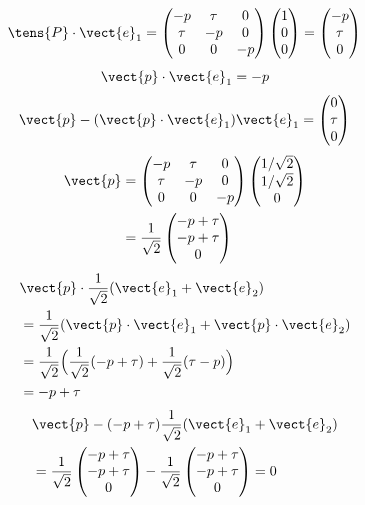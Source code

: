 \[ \tens{P}\cdot\vect{e}_{1}=\begin{pmatrix}-p&\tau&0\\\tau&-p&0\\0&0&-p\end{pmatrix}\begin{pmatrix}1\\0\\0\end{pmatrix}=\begin{pmatrix}-p\\\tau\\0\end{pmatrix} \]
\[ \vect{p}\cdot\vect{e}_{1}=-p \]
\[ \vect{p}-(\vect{p}\cdot\vect{e}_{1})\vect{e}_{1}=\begin{pmatrix}0\\\tau\\0\end{pmatrix} \]
\begin{align*}
\vect{p}&=\begin{pmatrix}-p&\tau&0\\\tau&-p&0\\0&0&-p\end{pmatrix}\begin{pmatrix}1/\sqrt{2}\\1/\sqrt{2}\\0\end{pmatrix}\\
&=\frac{1}{\sqrt{2}}\begin{pmatrix}-p+\tau\\-p+\tau\\0\end{pmatrix}
\end{align*}
\begin{align*}
&\vect{p}\cdot\frac{1}{\sqrt{2}}(\vect{e}_{1}+\vect{e}_{2})\\
&=\frac{1}{\sqrt{2}}(\vect{p}\cdot\vect{e}_{1}+\vect{p}\cdot\vect{e}_{2})\\
&=\frac{1}{\sqrt{2}}\Bigl(\frac{1}{\sqrt{2}}(-p+\tau)+\frac{1}{\sqrt{2}}(\tau-p)\Bigr)\\
&=-p+\tau
\end{align*}
\begin{align*}
&\vect{p}-(-p+\tau)\frac{1}{\sqrt{2}}(\vect{e}_{1}+\vect{e}_{2})\\
&=\frac{1}{\sqrt{2}}\begin{pmatrix}-p+\tau\\-p+\tau\\0\end{pmatrix}-\frac{1}{\sqrt{2}}\begin{pmatrix}-p+\tau\\-p+\tau\\0\end{pmatrix}=0
\end{align*}
